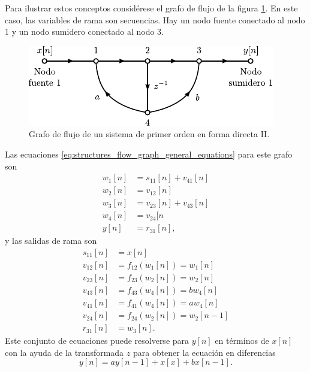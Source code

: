 \documentclass[a4paper]{report}
\begin{document}
Para ilustrar estos conceptos considérese el grafo de flujo de la figura \ref{fig:structures_flow_graph_ecuations_example}. En este caso, las variables de rama son secuencias. Hay un nodo fuente conectado al nodo 1 y un nodo sumidero conectado al nodo 3.
\begin{figure}[!htb]
 \begin{minipage}[c]{0.58\textwidth}
  \includegraphics[width=\textwidth]{figuras/structures_flow_graph_ecuations_example.pdf}
 \end{minipage}\hfill
 \begin{minipage}[c]{0.32\textwidth}
  \caption{
   Grafo de flujo de un sistema de primer orden en forma directa II. 
   }\label{fig:structures_flow_graph_ecuations_example}
 \end{minipage}
\end{figure} 
Las ecuaciones \ref{eq:structures_flow_graph_general_equations} para este grafo son
\begin{align*}
 w_1[n]&=s_{11}[n]+v_{41}[n]\\
 w_2[n]&=v_{12}[n]\\
 w_3[n]&=v_{23}[n]+v_{43}[n]\\
 w_4[n]&=v_{24}[n\\
 y[n]&=r_{31}[n],
\end{align*}
y las salidas de rama son
\begin{align*}
 s_{11}[n]&=x[n]\\
 v_{12}[n]&=f_{12}(w_1[n])=w_1[n]\\
 v_{23}[n]&=f_{23}(w_2[n])=w_2[n]\\
 v_{43}[n]&=f_{43}(w_4[n])=bw_4[n]\\
 v_{41}[n]&=f_{41}(w_4[n])=aw_4[n]\\
 v_{24}[n]&=f_{24}(w_2[n])=w_2[n-1]\\
 r_{31}[n]&=w_3[n].
\end{align*}
Este conjunto de ecuaciones puede resolverse para \(y[n]\) en términos de \(x[n]\) con la ayuda de la transformada \(z\) para obtener la ecuación en diferencias 
\[
 y[n]=ay[n-1]+x[x]+bx[n-1].
\]
\end{document}
